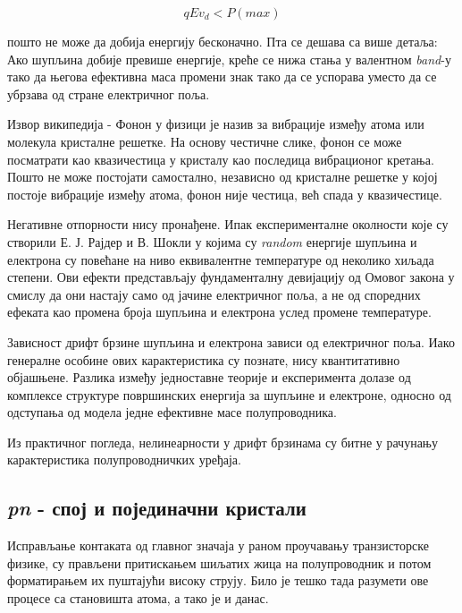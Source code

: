 \documentclass{article}
\begin{document}
\begin{equation}
    q E v_d < P(max)
\end{equation}

пошто не може да добија енергију бесконачно. Пта се дешава са више детаља: Ако шупљина добије превише енергије, креће се нижа стања у валентном \textit{band}-у тако да његова ефективна маса промени знак тако да се успорава уместо да се убрзава од стране електричног поља.

\begin{info}
    Извор википедија - Фонон у физици је назив за вибрације између атома или молекула кристалне решетке. На основу честичне слике, фонон се може посматрати као квазичестица у кристалу као последица вибрационог кретања. Пошто не може постојати самостално, независно од кристалне решетке у којој постоје вибрације између атома, фонон није честица, већ спада у квазичестице. 
\end{info}

Негативне отпорности нису пронађене. Ипак експерименталне околности које су створили Е. Ј. Рајдер и В. Шокли у којима су \textit{random} енергије шупљина и електрона су повећане на ниво еквивалентне температуре од неколико хиљада степени. Ови ефекти представљају фундаменталну девијацију од Омовог закона у смислу да они настају само од јачине електричног поља, а не од споредних ефеката као промена броја шупљина и електрона услед промене температуре.

Зависност дрифт брзине шупљина и електрона зависи од електричног поља. Иако генералне особине ових карактеристика су познате, нису квантитативно објашњене. Разлика између једноставне теорије и експеримента долазе од комплексе структуре површинских енергија за шупљине и електроне, односно од одступања од модела једне ефективне масе полупроводника.

Из практичног погледа, нелинеарности у дрифт брзинама су битне у рачунању карактеристика полупроводничких уређаја.

\subsection{\textit{pn} - спој и појединачни кристали}

Исправљање контаката од главног значаја у раном проучавању транзисторске физике, су прављени притискањем шиљатих жица на полупроводник и потом форматирањем их пуштајући високу струју. Било је тешко тада разумети ове процесе са становишта атома, а тако је и данас.
\end{document}
